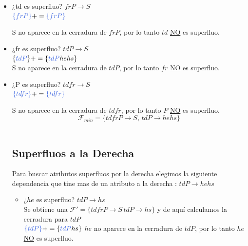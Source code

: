 \documentclass[10pt]{article}
\begin{document}
   \begin{itemize}
   	\item ¿td es superfluo? $frP \rightarrow S$\\
   	$\textcolor{RoyalBlue}{\{frP\}}+= \textcolor{RoyalBlue}{\{frP\}} $
   	
   	
   	S no aparece en la cerradura de $frP$, por lo tanto $td$ \underline{NO} es superfluo.\\
   	
   	\item ¿fr es superfluo? $tdP \rightarrow S$\\
   	$\{\textcolor{RoyalBlue}{tdP}\}+= \{\textcolor{RoyalBlue}{tdP}hehs\}$\\
   	
   	S no aparece en la cerradura de $tdP$, por lo tanto $fr$ \underline{NO} es superfluo.\\
   	
   	\item ¿P es superfluo? $tdfr \rightarrow S$\\
   	$\textcolor{RoyalBlue}{\{tdfr\}}+= \textcolor{RoyalBlue}{\{tdfr\}} $
   	
   	S no aparece en la cerradura de $tdfr$, por lo tanto $P$ \underline{NO} es superfluo.\\
   	
   	
   	$$\mathcal{F}_{min}=\{ tdfrP \rightarrow S,\, tdP \rightarrow hehs\}$$\\
   	
   	\subsection{Superfluos a la Derecha}
   	
   	Para buscar atributos superfluos por la derecha elegimos la siguiente dependencia que tine mas de un atributo a la derecha : $tdP \rightarrow hehs$
   	
   	
   	\begin{itemize}
   		\item ¿$he$ es superfluo? $tdP \rightarrow hs$\\
   		Se obtiene una $\mathcal{F'} = \{tdfrP \rightarrow S \,tdP \rightarrow hs\}$ y de aquí calculamos la cerradura para $tdP$\\
   		$\textcolor{RoyalBlue}{\{tdP\}}+= \{\textcolor{RoyalBlue}{tdP}hs\}$
   		$he$ no aparece en la cerradura de $tdP$, por lo tanto $he$ \underline{NO} es superfluo.\\
   		

\end{itemize}
\end{itemize}
\end{document}
